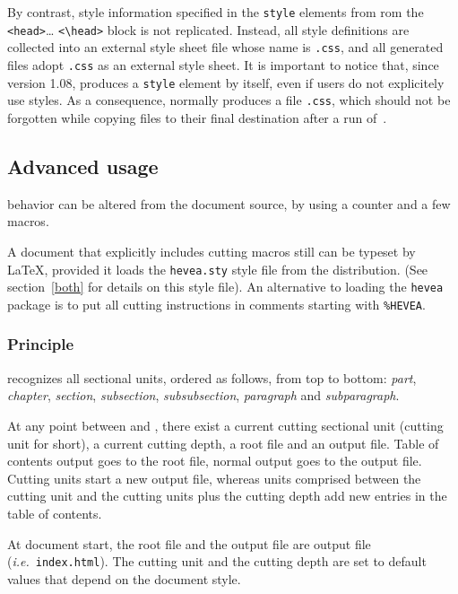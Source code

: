 \label{hacha:style}%
By contrast, style information specified in the \verb+style+ elements
from rom the \verb+<head>+\ldots{} \verb+<\head>+
block is not replicated. Instead, all style definitions are collected into an
external style sheet file whose name is \texttt{.css},
and all generated {\html} files adopt \texttt{.css} as
an external style sheet.
It is important to notice that, since version 1.08, \hevea{} produces
a \verb+style+ element by itself, even if users do not explicitely
use styles. As a consequence,
\hacha{} normally produces a
file \texttt{.css}, which should not be forgotten while
copying files to their final destination after a run of~\hacha.

\subsection{Advanced usage}

\hacha{} behavior can be altered from the document source, by using
a counter and a few macros.

A document that explicitly includes cutting macros still can be typeset by
\LaTeX{}, provided it loads the
\texttt{hevea.sty} style file from the \hevea{} distribution.
(See section~\ref{both} for details on this style file).
An alternative to loading the \texttt{hevea} package is to put
all cutting instructions in comments starting with \verb+%HEVEA+.



\subsubsection{Principle}
{\hacha} recognizes all sectional units, ordered as follows, from
top to bottom: {\em
part}, {\em chapter},
{\em section}, {\em subsection}, {\em subsubsection},
\emph{paragraph} and \emph{subparagraph}.

At any point between \verb++ and
\verb++,
there exist a current cutting sectional unit (cutting unit for short),
a current cutting depth, a root file and an output file.
Table of contents output goes to the root file, normal output goes to
the output file.
Cutting units start a new output file, whereas units comprised between the
cutting unit and the cutting units plus the cutting depth add new
entries in the table of contents.

At document start, the root file and the output file are {\hacha}
output file (\emph{i.e.}\ \texttt{index.html}).
The cutting unit and the cutting depth are set to default values that
depend on the document style.

